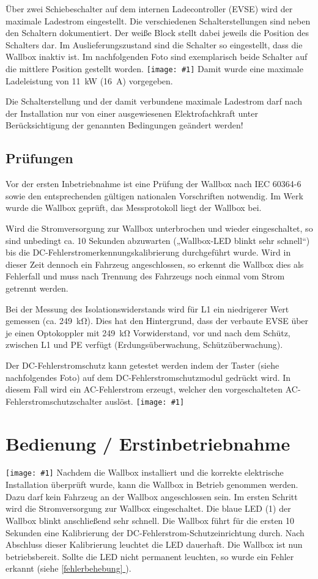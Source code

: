 \documentclass[a4paper,10pt]{article}
\newcommand{\hint}[1]{\begin{tcolorbox}[colback=boxgray,colframe=black,coltext=
white,title=Hinweis]#1\end{tcolorbox}}
\newcommand{\gfx}[1]{\texttt{[image: \#1]}}
\newcommand*{\fullref}[1]{\hyperref[{#1}]{\ref*{#1} \nameref*{#1}}}
\begin{document}
\begin{multicols*}{2}
	Über zwei Schiebeschalter auf dem internen Ladecontroller (EVSE) wird der
	maximale Ladestrom eingestellt. Die verschiedenen Schalterstellungen sind neben
	den Schaltern dokumentiert. Der weiße Block stellt dabei jeweils die Position
	des Schalters dar. Im Auslieferungszustand sind die Schalter so eingestellt,
	dass die Wallbox inaktiv ist. Im nachfolgenden Foto sind exemplarisch beide
	Schalter auf die mittlere Position gestellt worden. 
	\gfx{./img/resized/warp_evse_switch_cut_ready} Damit wurde eine
	maximale Ladeleistung von \SI{11}{\kilo\watt} (\SI{16}{\ampere}) vorgegeben.
 	\hint{Die Schalterstellung und der damit verbundene maximale Ladestrom darf nach der
		Installation nur von einer ausgewiesenen Elektrofachkraft unter
		Berücksichtigung der genannten Bedingungen geändert werden!}

	\subsection{Prüfungen}
	Vor der ersten Inbetriebnahme ist eine Prüfung der Wallbox nach IEC 60364-6
	sowie den entsprechenden gültigen nationalen Vorschriften notwendig. Im Werk
	wurde die Wallbox geprüft, das Messprotokoll liegt der Wallbox bei.

	Wird die Stromversorgung zur Wallbox unterbrochen und wieder eingeschaltet, so
	sind unbedingt ca. 10 Sekunden abzuwarten („Wallbox-LED blinkt sehr schnell“)
	bis die DC-Fehlerstromerkennungskalibrierung durchgeführt wurde. Wird in
	dieser Zeit dennoch ein Fahrzeug angeschlossen, so erkennt die Wallbox dies
	als Fehlerfall und muss nach Trennung des Fahrzeugs noch einmal vom Strom
	getrennt werden.

	Bei der Messung des Isolationswiderstands wird für L1 ein niedrigerer Wert
	gemessen (ca. \SI{249}{\kilo\ohm}). Dies hat den Hintergrund, dass
	der verbaute EVSE über je einen Optokoppler mit
	\SI{249}{\kilo\ohm} Vorwiderstand, vor und nach dem Schütz, zwischen L1 und
	PE verfügt (Erdungsüberwachung, Schützüberwachung).

	Der DC-Fehlerstromschutz kann getestet werden indem der Taster (siehe
	nachfolgendes Foto) auf dem DC-Fehlerstromschutzmodul gedrückt wird. In diesem
	Fall wird ein AC-Fehlerstrom erzeugt, welcher den vorgeschalteten
	AC-Fehlerstromschutzschalter auslöst. \gfx{./img/resized/warp_hole_button_ready} \newpage
	\section{Bedienung / Erstinbetriebnahme} \gfx{./img/resized/warp_button_key_ready} Nachdem die Wallbox installiert
	und die korrekte elektrische Installation überprüft wurde, kann die Wallbox in
	Betrieb genommen werden. Dazu darf kein Fahrzeug an der Wallbox angeschlossen
	sein. Im ersten Schritt wird die Stromversorgung zur Wallbox eingeschaltet. Die
	blaue LED (1) der Wallbox blinkt anschließend sehr schnell. Die Wallbox führt
	für die ersten 10 Sekunden eine Kalibrierung der
	DC-Fehlerstrom-Schutzeinrichtung durch. Nach Abschluss dieser Kalibrierung
	leuchtet die LED dauerhaft. Die Wallbox ist nun betriebsbereit. Sollte die LED
	nicht permanent leuchten, so wurde ein Fehler erkannt (siehe
	\fullref{fehlerbehebung}).


\end{multicols*}
\end{document}
